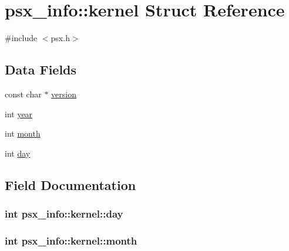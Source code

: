 \hypertarget{structpsx__info_1_1kernel}{}\section{psx\+\_\+info\+:\+:kernel Struct Reference}
\label{structpsx__info_1_1kernel}


{\ttfamily \#include $<$psx.\+h$>$}

\subsection*{Data Fields}
\begin{DoxyCompactItemize}
\item 
const char $\ast$ \hyperlink{structpsx__info_1_1kernel_adf920bd7e3545f508697900f6da60940}{version}
\item 
int \hyperlink{structpsx__info_1_1kernel_a347d5fa74908bbc54b31530a0a3e3416}{year}
\item 
int \hyperlink{structpsx__info_1_1kernel_a82f74ec63c15c58bbd6f3a7b3efd3d68}{month}
\item 
int \hyperlink{structpsx__info_1_1kernel_a7fbcf81b0b1cbb011bb3fcb4e7869723}{day}
\end{DoxyCompactItemize}


\subsection{Field Documentation}
\hypertarget{structpsx__info_1_1kernel_a7fbcf81b0b1cbb011bb3fcb4e7869723}{}
\subsubsection[{day}]{\setlength{\rightskip}{0pt plus 5cm}int psx\+\_\+info\+::kernel\+::day}\label{structpsx__info_1_1kernel_a7fbcf81b0b1cbb011bb3fcb4e7869723}
\hypertarget{structpsx__info_1_1kernel_a82f74ec63c15c58bbd6f3a7b3efd3d68}{}
\subsubsection[{month}]{\setlength{\rightskip}{0pt plus 5cm}int psx\+\_\+info\+::kernel\+::month}\label{structpsx__info_1_1kernel_a82f74ec63c15c58bbd6f3a7b3efd3d68}
\hypertarget{structpsx__info_1_1kernel_adf920bd7e3545f508697900f6da60940}{}
